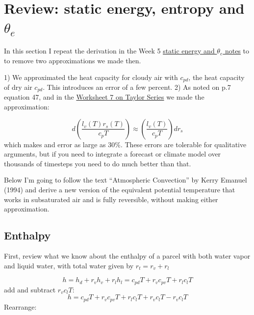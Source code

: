 \documentclass[12pt]{article}
\begin{document}
\pagestyle{first}


\section{Review:  static energy, entropy and $\theta_e$}

In this section I repeat the derivation in the 
Week 5 \href{https://drive.google.com/file/d/1BPTvFijtktG4135T1X8DXwI8l_C8xHEt/view?usp=sharing}{static energy and $\theta_e$ notes} to to remove two approximations we made then.

1) We approximated the heat capacity for cloudy air with $c_{pd}$, the heat capacity of dry air $c_{pd}$. This introduces an error of a few percent.
2) As noted on p.7 equation 47, and in the
\href{https://phaustin.github.io/a405/notebooks/worksheets/worksheet7_taylor_solution.html}{Worksheet 7 on Taylor Series} we made the approximation:

\begin{equation}
d  \left ( \frac{l_v(T) r_s(T)}{c_p T} \right ) \approx  \left ( \frac{l_v(T) }{c_p T} \right ) dr_s
\end{equation}
which makes and error as large as 30\%.  These errors are tolerable for qualitative arguments, but if you need to integrate a forecast or climate model over thousands of timesteps you need to do much better than that.

Below I'm going to follow the text ``Atmospheric Convection'' by Kerry Emanuel (1994) and derive a new
version of the equivalent potential temperature that works in
subsaturated air and is fully reversible, without making either approximation.


\subsection{Enthalpy}
\label{sec:enthalpy}


First, review what we know about the enthalpy of a parcel with both water vapor and liquid water,
with total water given by $r_t = r_v + r_l$

\begin{equation}
  \label{eq:h1}
  h = h_d + r_v h_v + r_l h_l = c_{pd} T + r_v c_{pv} T + r_l c_l T
\end{equation}
add and subtract $r_v c_l T$:
\begin{equation}
  \label{eq:h1b}
  h = c_{pd} T + r_v c_{pv} T + r_l c_l T + r_v c_l T - r_v c_l T
\end{equation}
Rearrange:
\end{document}
